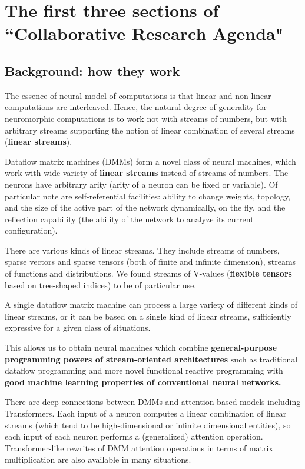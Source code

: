 \documentclass{article}
\begin{document}
\appendix

\section{The first three sections of ``Collaborative Research Agenda"}

\subsection{Background: how they work}

The essence of neural model of computations is that linear and non-linear computations are interleaved. Hence, the natural
degree of generality for neuromorphic computations is to work not with streams of numbers, but with arbitrary streams
supporting the notion of linear combination of several streams ({\bf linear streams}).

Dataflow matrix machines (DMMs) form a novel class of neural machines, which work with wide variety
of {\bf linear streams} instead of streams of numbers. The neurons have
arbitrary arity (arity of a neuron can be fixed or variable). Of particular note are
self-referential facilities: ability to change weights, topology, and the size of the active part of the network dynamically, on the fly,
and the reflection capability (the ability of the network to analyze its current configuration).

There are various kinds of linear streams. They include streams of numbers, sparse vectors and sparse tensors (both of
finite and infinite dimension), streams of functions and distributions. We found streams of V-values
({\bf flexible tensors} based on tree-shaped indices) to be of particular use.

A single dataflow matrix machine can process a large variety of different kinds of linear streams, or
it can be based on a single kind of linear streams, sufficiently expressive for a given class of situations.

This allows us to obtain 
neural machines which combine {\bf general-purpose programming powers of stream-oriented
architectures} such as traditional dataflow programming and
more novel functional reactive programming with {\bf good machine learning
properties of conventional neural networks.}

There are deep connections between DMMs and attention-based models including Transformers.
Each input of a neuron computes a linear combination of linear streams (which tend to be high-dimensional
or infinite dimensional entities), so each input of each neuron performs a (generalized) attention operation.
Transformer-like rewrites of DMM attention operations in terms of matrix multiplication are also available in many situations.
\end{document}
